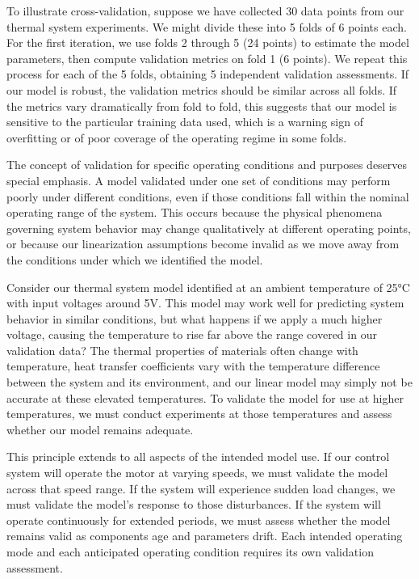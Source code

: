To illustrate cross-validation, suppose we have collected 30 data points from our thermal system experiments. We might divide these into 5 folds of 6 points each. For the first iteration, we use folds 2 through 5 (24 points) to estimate the model parameters, then compute validation metrics on fold 1 (6 points). We repeat this process for each of the 5 folds, obtaining 5 independent validation assessments. If our model is robust, the validation metrics should be similar across all folds. If the metrics vary dramatically from fold to fold, this suggests that our model is sensitive to the particular training data used, which is a warning sign of overfitting or of poor coverage of the operating regime in some folds.

The concept of validation for specific operating conditions and purposes deserves special emphasis. A model validated under one set of conditions may perform poorly under different conditions, even if those conditions fall within the nominal operating range of the system. This occurs because the physical phenomena governing system behavior may change qualitatively at different operating points, or because our linearization assumptions become invalid as we move away from the conditions under which we identified the model.

Consider our thermal system model identified at an ambient temperature of 25°C with input voltages around 5V. This model may work well for predicting system behavior in similar conditions, but what happens if we apply a much higher voltage, causing the temperature to rise far above the range covered in our validation data? The thermal properties of materials often change with temperature, heat transfer coefficients vary with the temperature difference between the system and its environment, and our linear model may simply not be accurate at these elevated temperatures. To validate the model for use at higher temperatures, we must conduct experiments at those temperatures and assess whether our model remains adequate.

This principle extends to all aspects of the intended model use. If our control system will operate the motor at varying speeds, we must validate the model across that speed range. If the system will experience sudden load changes, we must validate the model's response to those disturbances. If the system will operate continuously for extended periods, we must assess whether the model remains valid as components age and parameters drift. Each intended operating mode and each anticipated operating condition requires its own validation assessment.

